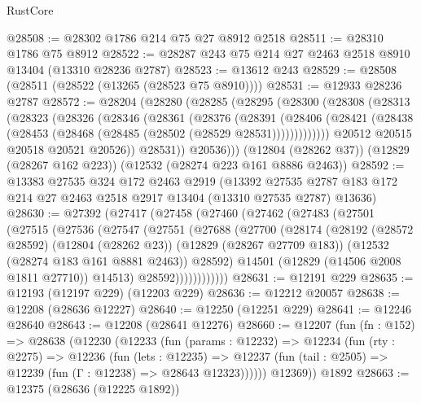 \begin{lexlean}{RustCore}
\begin{coremodule}
@28508 := @28302 @1786 @214 @75 @27 @8912 @2518
@28511 := @28310 @1786 @75 @8912
@28522 := @28287 @243 @75 @214 @27 @2463 @2518 @8910 @13404 (@13310 @28236 @2787)
@28523 := @13612 @243
@28529 := @28508 (@28511 (@28522 (@13265 (@28523 @75 @8910))))
@28531 := @12933 @28236 @2787
@28572 := @28204
    (@28280
      (@28285
        (@28295
          (@28300
            (@28308
              (@28313
                (@28323
                  (@28326
                    (@28346
                      (@28361
                        (@28376
                          (@28391
                            (@28406
                              (@28421
                                (@28438 (@28453 (@28468 (@28485 (@28502 (@28529 @28531)))))))))))))
                  @20512
                  @20515
                  @20518
                  @20521
                  @20526))
              @28531))
          @20536)))
    (@12804 (@28262 @37))
    (@12829 (@28267 @162 @223))
    (@12532 (@28274 @223 @161 @8886 @2463))
@28592 := @13383
    @27535
    @324
    @172
    @2463
    @2919
    (@13392 @27535 @2787 @183 @172 @214 @27 @2463 @2518 @2917 @13404 (@13310 @27535 @2787) @13636)
@28630 := @27392
    (@27417
      (@27458
        (@27460
          (@27462
            (@27483
              (@27501
                (@27515
                  (@27536
                    (@27547
                      (@27551
                        (@27688
                          (@27700
                            (@28174
                              (@28192
                                (@28572 @28592)
                                (@12804 (@28262 @23))
                                (@12829 (@28267 @27709 @183))
                                (@12532 (@28274 @183 @161 @8881 @2463))
                                @28592)
                              @14501
                              (@12829 (@14506 @2008 @1811 @27710))
                              @14513)
                            @28592))))))))))))
@28631 := @12191 @229
@28635 := @12193 (@12197 @229) (@12203 @229)
@28636 := @12212 @20057
@28638 := @12208 (@28636 @12227)
@28640 := @12250 (@12251 @229)
@28641 := @12246 @28640
@28643 := @12208 (@28641 @12276)
@28660 := @12207
    (fun (fn : @152) =>
    @28638
      (@12230
        (@12233
          (fun (params : @12232) =>
          @12234
            (fun (rty : @2275) =>
            @12236
              (fun (lets : @12235) =>
              @12237 (fun (tail : @2505) => @12239 (fun (Γ : @12238) => @28643 @12323))))))
        @12369))
    @1892
@28663 := @12375 (@28636 (@12225 @1892))

\end{coremodule}
\end{lexlean}
